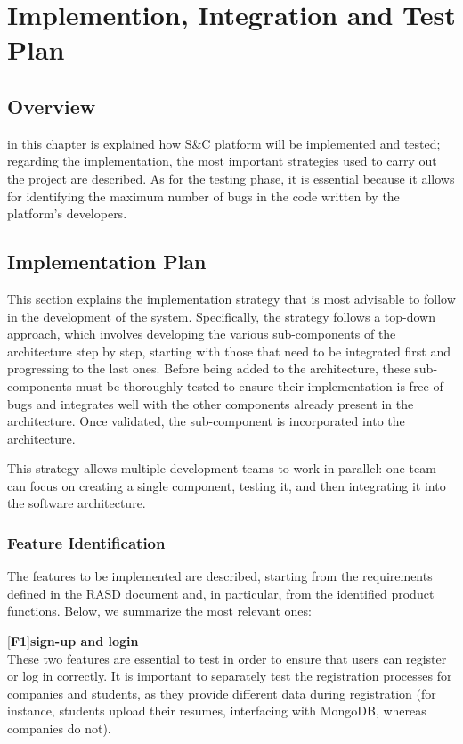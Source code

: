 \chapter{Implemention, Integration and Test Plan}

		\section{Overview}
	in this chapter is explained how S\&C platform will be implemented and tested; regarding the implementation, the most important strategies used to carry out the project are described. As for the testing phase, it is essential because it allows for identifying the maximum number of bugs in the code written by the platform's developers.
	
	\section{Implementation Plan}
	This section explains the implementation strategy that is most advisable to follow in the development of the system. Specifically, the strategy follows a top-down approach, which involves developing the various sub-components of the architecture step by step, starting with those that need to be integrated first and progressing to the last ones. 
	Before being added to the architecture, these sub-components must be thoroughly tested to ensure their implementation is free of bugs and integrates well with the other components already present in the architecture. Once validated, the sub-component is incorporated into the architecture.
	
	This strategy allows multiple development teams to work in parallel: one team can focus on creating a single component, testing it, and then integrating it into the software architecture.
	
	\subsection{Feature Identification}
	The features to be implemented are described, starting from the requirements defined in the RASD document and, in particular, from the identified product functions. Below, we summarize the most relevant ones:
	
	[\textbf{F1}]\textbf{sign-up and login}\\
	These two features are essential to test in order to ensure that users can register or log in correctly. It is important to separately test the registration processes for companies and students, as they provide different data during registration (for instance, students upload their resumes, interfacing with MongoDB, whereas companies do not).
	
